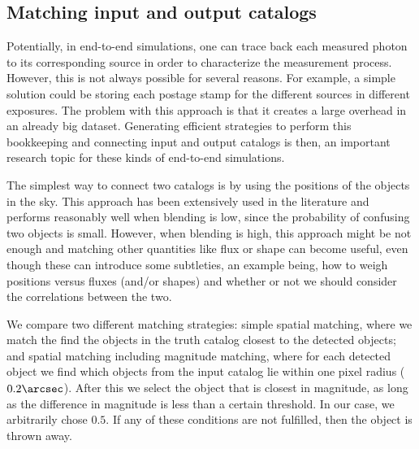 \documentclass[\docopts]{\docclass}
\begin{document}
\subsection{Matching input and output catalogs}
\label{sec:matching}

Potentially, in end-to-end simulations, one can trace back each measured photon to its corresponding source in order to characterize the measurement process. However, this is not always possible for several reasons. For example, a simple solution could be storing each postage stamp for the different sources in different exposures. The problem with this approach is that it creates a large overhead in an already big dataset. Generating efficient strategies to perform this bookkeeping and connecting input and output catalogs is then, an important research topic for these kinds of end-to-end simulations. 

The simplest way to connect two catalogs is by using the positions of the objects in the sky. This approach has been extensively used in the literature and performs reasonably well when blending is low, since the probability of confusing two objects is small. However, when blending is high, this approach might be not enough and matching other quantities like flux or shape can become useful, even though these can introduce some subtleties, an example being, how to weigh positions versus fluxes (and/or shapes) and whether or not we should consider the correlations between the two.

We compare two different matching strategies: simple spatial matching, where we match the find the objects in the truth catalog closest to the detected objects; and spatial matching including magnitude matching, where for each detected object we find which objects from the input catalog lie within one pixel radius ($0.2 \arcsec$). After this we select the object that is closest in magnitude, as long as the difference in magnitude is less than a certain threshold. In our case, we arbitrarily chose $0.5$. If any of these conditions are not fulfilled, then the object is thrown away.
\end{document}
